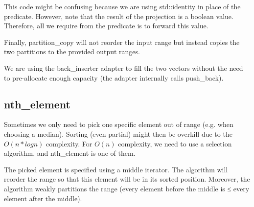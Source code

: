 This code might be confusing because we are using std::identity in place of the predicate. However, note that the result of the projection is a boolean value. Therefore, all we require from the predicate is to forward this value.

Finally, partition\_copy will not reorder the input range but instead copies the two partitions to the provided output ranges.



\begin{box-note}
\end{box-note}

We are using the back\_inserter adapter to fill the two vectors without the need to pre-allocate enough capacity (the adapter internally calls push\_back).

\subsection{nth\_element}

Sometimes we only need to pick one specific element out of range (e.g. when choosing a median). Sorting (even partial) might then be overkill due to the $O(n*logn)$ complexity. For $O(n)$ complexity, we need to use a selection algorithm, and nth\_element is one of them.



The picked element is specified using a middle iterator. The algorithm will reorder the range so that this element will be in its sorted position. Moreover, the algorithm weakly partitions the range (every element before the middle is ≤ every element after the middle).

